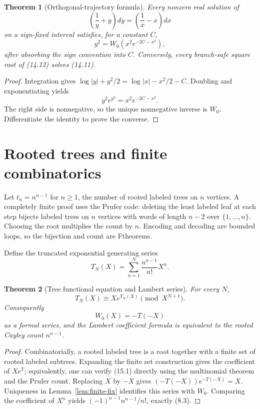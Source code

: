 \documentclass[11pt]{article}
\newtheorem{theorem}{Theorem}[section]
\theoremstyle{definition}
\newcommand{\abs}[1]{\left|#1\right|}
\newcommand{\StatusF}{\textsf{F}}
\begin{document}
\begin{theorem}[Orthogonal-trajectory formula]\label{thm:orthogonal}
Every nonzero real solution of
\[
 \left(\frac1y+y\right)dy=
 \left(\frac1x-x\right)dx
 \tag{14.11}
\]
on a sign-fixed interval satisfies, for a constant \(C\),
\[
 y^2=W_0\!\left(x^2e^{-2C-x^2}\right),
 \tag{14.12}
\]
after absorbing the sign convention into \(C\).  Conversely, every branch-safe
square root of (14.12) solves (14.11).
\end{theorem}

\begin{proof}
Integration gives
\(\log\abs y+y^2/2=\log\abs x-x^2/2-C\).  Doubling and exponentiating yields
\[
 y^2 e^{y^2}=x^2e^{-2C-x^2}.
\]
The right side is nonnegative, so the unique nonnegative inverse is \(W_0\).
Differentiate the identity to prove the converse.
\end{proof}

\section{Rooted trees and finite combinatorics}\label{sec:trees}

Let \(t_n=n^{n-1}\) for \(n\ge1\), the number of rooted labeled trees on
\(n\) vertices.  A completely finite proof uses the Prufer code: deleting the
least labeled leaf at each step bijects labeled trees on \(n\) vertices with
words of length \(n-2\) over \(\{1,\ldots,n\}\).  Choosing the root multiplies
the count by \(n\).  Encoding and decoding are bounded loops, so the bijection
and count are \StatusF theorems.

Define the truncated exponential generating series
\[
 T_N(X)=\sum_{n=1}^{N}\frac{n^{n-1}}{n!}X^n.
\]

\begin{theorem}[Tree functional equation and Lambert series]\label{thm:trees}
For every \(N\),
\[
 T_N(X)\equiv X e^{T_N(X)}\pmod{X^{N+1}}.
 \tag{15.1}
\]
Consequently
\[
 W_0(X)=-T(-X)
 \tag{15.2}
\]
as a formal series, and the Lambert coefficient formula is equivalent to the
rooted Cayley count \(n^{n-1}\).
\end{theorem}

\begin{proof}
Combinatorially, a rooted labeled tree is a root together with a finite set of
rooted labeled subtrees.  Expanding the finite set construction gives the
coefficient of \(Xe^T\); equivalently, one can verify (15.1) directly using
the multinomial theorem and the Prufer count.  Replacing \(X\) by \(-X\) gives
\((-T(-X))e^{-T(-X)}=X\).  Uniqueness in
Lemma~\ref{lem:finite-fix} identifies this series with \(W_0\).  Comparing the
coefficient of \(X^n\) yields
\((-1)^{n-1}n^{n-1}/n!\), exactly (8.3).
\end{proof}
\end{document}
